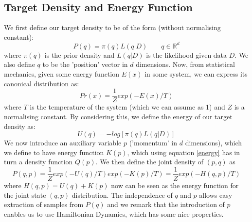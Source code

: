 \documentclass[11pt]{article}
\begin{document}
\subsection{Target Density and Energy Function}
We first define our target density to be of the form (without normalising constant):
\begin{equation}
P(q)= \pi(q)L(q|D) \quad \quad q \in \mathbb{R}^{d}
\end{equation}
where $\pi(q)$ is the prior density and $L(q|D)$ is the likelihood given data $D$. 
We also define $q$ to be the 'position' vector in $d$ dimensions. Now, from statistical mechanics, given some energy function $E(x)$ in some system, we can express its canonical distribution as:
\begin{equation}
\label{energy}
Pr(x) = \frac{1}{Z}exp(-E(x)/T)
\end{equation}
where $T$ is the temperature of the system (which we can assume as 1) and $Z$ is a normalising constant. By considering this, we define the energy of our target density as:
\begin{equation}
U(q) = -log[\pi(q)L(q|D)]
\end{equation}
We now introduce an auxiliary variable $p$ ('momentum' in $d$ dimensions), which we define to have energy function $K(p)$, which using equation \ref{energy} has in turn a density function $Q(p)$. We then define the joint density of $(p,q)$ as 
\begin{equation}
P(q,p) = \frac{1}{Z}exp(-U(q)/T)exp(-K(p)/T) = \frac{1}{Z}exp(-H(q,p)/T)
\end{equation}
where $H(q,p) = U(q) + K(p)$ now can be seen as the energy function for the joint state $(q,p)$ distribution. The independence of $q$ and $p$ allows easy extraction of samples from $P(q)$ and we remark that the introduction of $p$ enables us to use Hamiltonian Dynamics, which has some nice properties. 
\end{document}
